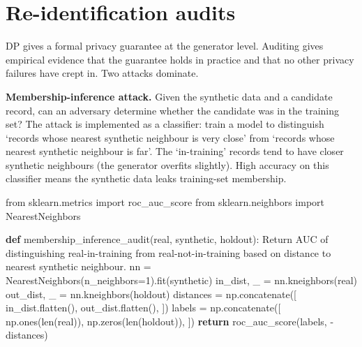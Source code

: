 \documentclass[
  letterpaper,
  11pt]{scrbook}
\newenvironment{Shaded}{\begin{snugshade}}{\end{snugshade}}
\newcommand{\BuiltInTok}[1]{\textcolor[rgb]{0.00,0.23,0.31}{#1}}
\newcommand{\CommentTok}[1]{\textcolor[rgb]{0.37,0.37,0.37}{#1}}
\newcommand{\ControlFlowTok}[1]{\textcolor[rgb]{0.00,0.23,0.31}{\textbf{#1}}}
\newcommand{\DecValTok}[1]{\textcolor[rgb]{0.68,0.00,0.00}{#1}}
\newcommand{\ImportTok}[1]{\textcolor[rgb]{0.00,0.46,0.62}{#1}}
\newcommand{\KeywordTok}[1]{\textcolor[rgb]{0.00,0.23,0.31}{\textbf{#1}}}
\newcommand{\NormalTok}[1]{\textcolor[rgb]{0.00,0.23,0.31}{#1}}
\newcommand{\OperatorTok}[1]{\textcolor[rgb]{0.37,0.37,0.37}{#1}}
\begin{document}
\section{Re-identification audits}\label{re-identification-audits}

DP gives a formal privacy guarantee at the generator level. Auditing
gives empirical evidence that the guarantee holds in practice and that
no other privacy failures have crept in. Two attacks dominate.

\textbf{Membership-inference attack.} Given the synthetic data and a
candidate record, can an adversary determine whether the candidate was
in the training set? The attack is implemented as a classifier: train a
model to distinguish `records whose nearest synthetic neighbour is very
close' from `records whose nearest synthetic neighbour is far'. The
`in-training' records tend to have closer synthetic neighbours (the
generator overfits slightly). High accuracy on this classifier means the
synthetic data leaks training-set membership.

\begin{Shaded}
\begin{Highlighting}[]
\ImportTok{from}\NormalTok{ sklearn.metrics }\ImportTok{import}\NormalTok{ roc\_auc\_score}
\ImportTok{from}\NormalTok{ sklearn.neighbors }\ImportTok{import}\NormalTok{ NearestNeighbors}

\KeywordTok{def}\NormalTok{ membership\_inference\_audit(real, synthetic,}
\NormalTok{                                holdout):}
    \CommentTok{\textquotesingle{}\textquotesingle{}\textquotesingle{}Return AUC of distinguishing real{-}in{-}training}
\CommentTok{    from real{-}not{-}in{-}training based on distance to}
\CommentTok{    nearest synthetic neighbour.\textquotesingle{}\textquotesingle{}\textquotesingle{}}
\NormalTok{    nn }\OperatorTok{=}\NormalTok{ NearestNeighbors(n\_neighbors}\OperatorTok{=}\DecValTok{1}\NormalTok{).fit(synthetic)}
\NormalTok{    in\_dist, \_ }\OperatorTok{=}\NormalTok{ nn.kneighbors(real)}
\NormalTok{    out\_dist, \_ }\OperatorTok{=}\NormalTok{ nn.kneighbors(holdout)}
\NormalTok{    distances }\OperatorTok{=}\NormalTok{ np.concatenate([}
\NormalTok{        in\_dist.flatten(),}
\NormalTok{        out\_dist.flatten(),}
\NormalTok{    ])}
\NormalTok{    labels }\OperatorTok{=}\NormalTok{ np.concatenate([}
\NormalTok{        np.ones(}\BuiltInTok{len}\NormalTok{(real)),}
\NormalTok{        np.zeros(}\BuiltInTok{len}\NormalTok{(holdout)),}
\NormalTok{    ])}
    \ControlFlowTok{return}\NormalTok{ roc\_auc\_score(labels, }\OperatorTok{{-}}\NormalTok{distances)}
\end{Highlighting}
\end{Shaded}
\end{document}
